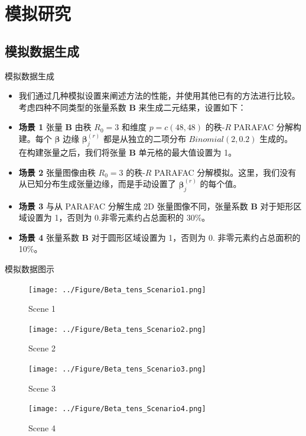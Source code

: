 \documentclass{beamer}
\begin{document}
	\section{模拟研究}
	\subsection{模拟数据生成}
	\begin{frame}{模拟数据生成}
		\begin{itemize}[<+->]
			\item 我们通过几种模拟设置来阐述方法的性能，并使用其他已有的方法进行比较。考虑四种不同类型的张量系数 $\bm{B}$ 来生成二元结果，设置如下：
			\item \textbf{场景 1} 张量 $\bm{B}$ 由秩 $R_0 = 3$ 和维度 $p = c(48, 48)$ 的秩-$R$ PARAFAC 分解构建。每个 $\bm{\beta}$ 边缘 $\bm{\beta}_j^{(r)}$ 都是从独立的二项分布 $Binomial(2, 0.2)$ 生成的。 在构建张量之后，我们将张量 $\bm{B}$ 单元格的最大值设置为 1。
			\item \textbf{场景 2} 张量图像由秩 $R_0 = 3$ 的秩-$R$ PARAFAC 分解模拟。这里，我们没有从已知分布生成张量边缘，而是手动设置了 $\bm{\beta}_j^{(r)}$ 的每个值。
			\item \textbf{场景 3} 与从 PARAFAC 分解生成 2D 张量图像不同，张量系数 $\bm{B}$ 对于矩形区域设置为 1，否则为 0.非零元素约占总面积的 30\%。
			\item \textbf{场景 4} 张量系数 $\bm{B}$ 对于圆形区域设置为 1，否则为 0. 非零元素约占总面积的 10\%。
		\end{itemize}
	\end{frame}
	\begin{frame}{模拟数据图示}
		\begin{figure}[h!]
			\centering
			\begin{minipage}{0.24\textwidth}
				\centering
				\texttt{[image: ../Figure/Beta\_tens\_Scenario1.png]}
				\caption{Scene 1}
				\label{fig:scene1}
			\end{minipage}
			\hfill
			\begin{minipage}{0.24\textwidth}
				\centering
				\texttt{[image: ../Figure/Beta\_tens\_Scenario2.png]}
				\caption{Scene 2}
				\label{fig:scene2}
			\end{minipage}
			\hfill
			\begin{minipage}{0.24\textwidth}
				\centering
				\texttt{[image: ../Figure/Beta\_tens\_Scenario3.png]}
				\caption{Scene 3}
				\label{fig:scene3}
			\end{minipage}
			\hfill
			\begin{minipage}{0.24\textwidth}
				\centering
				\texttt{[image: ../Figure/Beta\_tens\_Scenario4.png]}
				\caption{Scene 4}
				\label{fig:scene4}
			\end{minipage}
		\end{figure}
	\end{frame}
\end{document}

